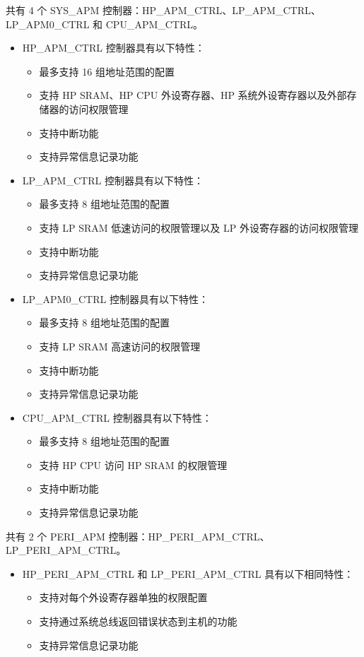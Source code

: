 \documentclass[main\_\_CN.tex]{subfiles}
\begin{document}
\chipname{} 共有 4 个 SYS\_APM 控制器：HP\_APM\_CTRL、LP\_APM\_CTRL、LP\_APM0\_CTRL 和 CPU\_APM\_CTRL。
\begin{itemize}
    \item HP\_APM\_CTRL 控制器具有以下特性：
        \begin{itemize}
        \item 最多支持 16 组地址范围的配置
        \item 支持 HP SRAM、HP CPU 外设寄存器、HP 系统外设寄存器以及外部存储器的访问权限管理
        \item 支持中断功能
        \item 支持异常信息记录功能
        \end{itemize}
    \item LP\_APM\_CTRL 控制器具有以下特性：
        \begin{itemize}
        \item 最多支持 8 组地址范围的配置
        \item 支持 LP SRAM 低速访问的权限管理以及 LP 外设寄存器的访问权限管理
        \item 支持中断功能
        \item 支持异常信息记录功能
        \end{itemize}
    \item LP\_APM0\_CTRL 控制器具有以下特性：
        \begin{itemize}
        \item 最多支持 8 组地址范围的配置
        \item 支持 LP SRAM 高速访问的权限管理
        \item 支持中断功能
        \item 支持异常信息记录功能
        \end{itemize}
    \item CPU\_APM\_CTRL 控制器具有以下特性：
        \begin{itemize}
        \item 最多支持 8 组地址范围的配置
        \item 支持 HP CPU 访问 HP SRAM 的权限管理
        \item 支持中断功能
        \item 支持异常信息记录功能
        \end{itemize}
\end{itemize}

\chipname{} 共有 2 个 PERI\_APM 控制器：HP\_PERI\_APM\_CTRL、LP\_PERI\_APM\_CTRL。
\begin{itemize}
    \item HP\_PERI\_APM\_CTRL 和 LP\_PERI\_APM\_CTRL 具有以下相同特性：
        \begin{itemize}
        \item 支持对每个外设寄存器单独的权限配置
        \item 支持通过系统总线返回错误状态到主机的功能
        \item 支持异常信息记录功能
        \end{itemize}
\end{itemize}
\end{document}
